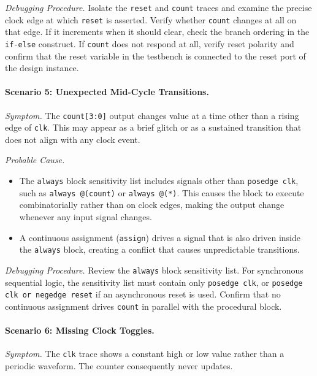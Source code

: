 \textit{Debugging Procedure.} Isolate the \texttt{reset} and \texttt{count}
traces and examine the precise clock edge at which \texttt{reset} is
asserted. Verify whether \texttt{count} changes at all on that edge. If
it increments when it should clear, check the branch ordering in the
\texttt{if-else} construct. If \texttt{count} does not respond at all,
verify reset polarity and confirm that the reset variable in the testbench
is connected to the reset port of the design instance.

\paragraph{Scenario 5: Unexpected Mid-Cycle Transitions.}

\textit{Symptom.} The \texttt{count[3:0]} output changes value at a time
other than a rising edge of \texttt{clk}. This may appear as a brief
glitch or as a sustained transition that does not align with any clock event.

\textit{Probable Cause.}
\begin{itemize}
    \item The \texttt{always} block sensitivity list includes signals other
          than \texttt{posedge clk}, such as \texttt{always @(count)}
          or \texttt{always @(*)}. This causes the block to execute
          combinatorially rather than on clock edges, making the output change
          whenever any input signal changes.
    \item A continuous assignment (\texttt{assign}) drives a signal that is
          also driven inside the \texttt{always} block, creating a conflict
          that causes unpredictable transitions.
\end{itemize}

\textit{Debugging Procedure.} Review the \texttt{always} block sensitivity
list. For synchronous sequential logic, the sensitivity list must contain
only \texttt{posedge clk}, or \texttt{posedge clk or negedge reset} if an
asynchronous reset is used. Confirm that no continuous assignment drives
\texttt{count} in parallel with the procedural block.

\paragraph{Scenario 6: Missing Clock Toggles.}

\textit{Symptom.} The \texttt{clk} trace shows a constant high or low value
rather than a periodic waveform. The counter consequently never updates.

